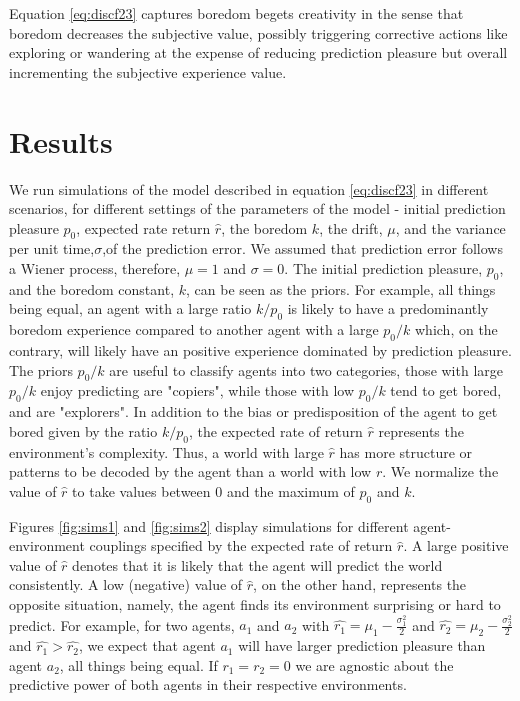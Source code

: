 \documentclass[11pt, onecolumn]{article}
\begin{document}
Equation \ref{eq:discf23} captures boredom begets creativity in the sense that boredom decreases the subjective value, possibly triggering corrective actions like exploring or wandering at the expense of reducing prediction pleasure but overall incrementing the subjective experience value.

\section{Results}
\label{se:re}

We run simulations of the model described in equation \ref{eq:discf23} in different scenarios, for different settings of the parameters of the model - initial prediction pleasure $p_0$, expected rate return $\hat{r}$, the boredom $k$, the drift, $\mu$, and the variance per unit time,$\sigma$,of the prediction error. We assumed that prediction error follows a Wiener process, therefore, $\mu = 1$ and $\sigma = 0$. 
The initial prediction pleasure, $p_0$, and the boredom constant, $k$, can be seen as the priors. For example, all things being equal, an agent with a large ratio $k/p_0$ is likely to have a predominantly boredom experience compared to another agent with a large $p_0/k$ which, on the contrary, will likely have an positive experience dominated by prediction pleasure. 
The priors $p_0/k$ are useful to classify agents into two categories, those with large $p_0/k$ enjoy predicting are "copiers", while those with low $p_0/k$ tend to get bored, and are "explorers". 
In addition to the bias or predisposition of the agent to get bored given by the ratio $k/p_0$, the expected rate of return $\hat{r}$ represents the environment's complexity. Thus, a world with large $\hat{r}$ has more structure or patterns to be decoded by the agent than a world with low $r$. We normalize the value of $\hat{r}$ to take values between $0$ and the maximum of $p_0$ and $k$.

Figures \ref{fig:sims1} and \ref{fig:sims2} display simulations for different agent-environment couplings specified by the expected rate of return $\hat{r}$. A large positive value of $\hat{r}$ denotes that it is likely that the agent will predict the world consistently. A low (negative) value of  $\hat{r}$, on the other hand, represents the opposite situation, namely, the agent finds its environment surprising or hard to predict. 
For example, for two agents, $a_1$ and $a_2$ with $\hat{r_1} = \mu_1 - \frac{\sigma_1 ^2}{2}$ and $\hat{r_2} = \mu_2 - \frac{\sigma_2 ^2}{2}$ and $\hat{r_1} > \hat{r_2}$, we expect that agent $a_1$ will have larger prediction pleasure than agent $a_2$, all things being equal. If $r_1 =r_2 = 0$ we are agnostic about the predictive power of both agents in their respective environments. 
\end{document}
